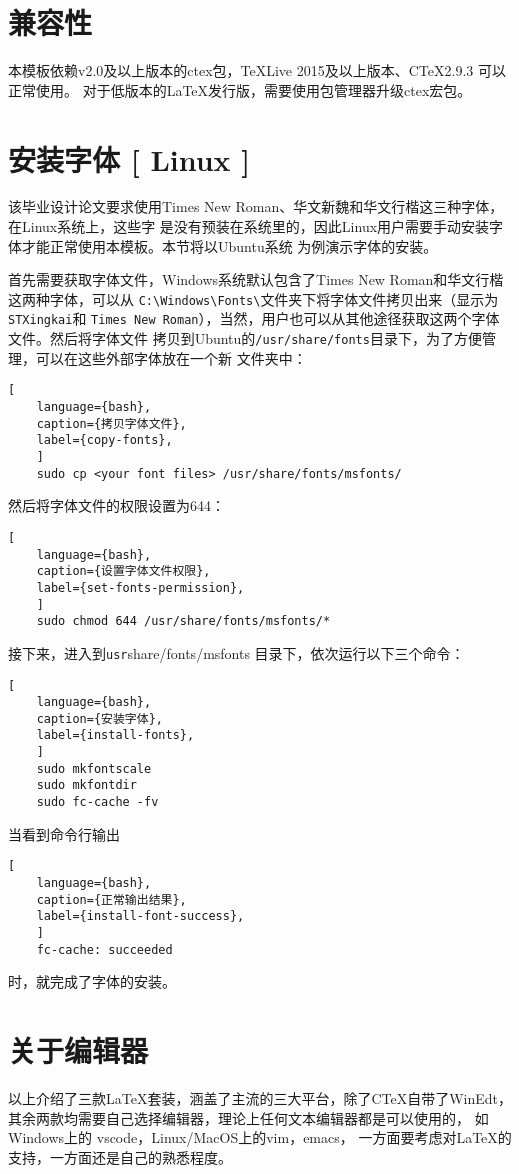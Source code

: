 \section{兼容性}

本模板依赖v2.0及以上版本的ctex包，\TeX{}Live 2015及以上版本、C\TeX{}2.9.3 可以正常使用。
对于低版本的\LaTeX{}发行版，需要使用包管理器升级ctex宏包。

\section{安装字体 [ Linux ]}

该毕业设计论文要求使用Times New Roman、华文新魏和华文行楷这三种字体，在Linux系统上，这些字
是没有预装在系统里的，因此Linux用户需要手动安装字体才能正常使用本模板。本节将以Ubuntu系统
为例演示字体的安装。

首先需要获取字体文件，Windows系统默认包含了Times New Roman和华文行楷这两种字体，可以从
\verb|C:\Windows\Fonts\|文件夹下将字体文件拷贝出来（显示为\verb|STXingkai|和
\verb|Times New Roman|），当然，用户也可以从其他途径获取这两个字体文件。然后将字体文件
拷贝到Ubuntu的\verb|/usr/share/fonts|目录下，为了方便管理，可以在这些外部字体放在一个新
文件夹中：
\begin{lstlisting}[
	language={bash},
	caption={拷贝字体文件},
	label={copy-fonts},
	]
	sudo cp <your font files> /usr/share/fonts/msfonts/
\end{lstlisting}
然后将字体文件的权限设置为644：
\begin{lstlisting}[
	language={bash},
	caption={设置字体文件权限},
	label={set-fonts-permission},
	]
	sudo chmod 644 /usr/share/fonts/msfonts/*
\end{lstlisting}
接下来，进入到{\verb /usr/share/fonts/msfonts } 目录下，依次运行以下三个命令：
\begin{lstlisting}[
	language={bash},
	caption={安装字体},
	label={install-fonts},
	]
	sudo mkfontscale
	sudo mkfontdir
	sudo fc-cache -fv
\end{lstlisting}
当看到命令行输出
\begin{lstlisting}[
	language={bash},
	caption={正常输出结果},
	label={install-font-success},
	]
	fc-cache: succeeded
\end{lstlisting}
时，就完成了字体的安装。

\section{关于编辑器}

以上介绍了三款\LaTeX{}套装，涵盖了主流的三大平台，除了C\TeX{}自带了WinEdt，
其余两款均需要自己选择编辑器，理论上任何文本编辑器都是可以使用的，
如Windows上的 vscode，Linux/MacOS上的vim，emacs，
一方面要考虑对\LaTeX{}的支持，一方面还是自己的熟悉程度。

